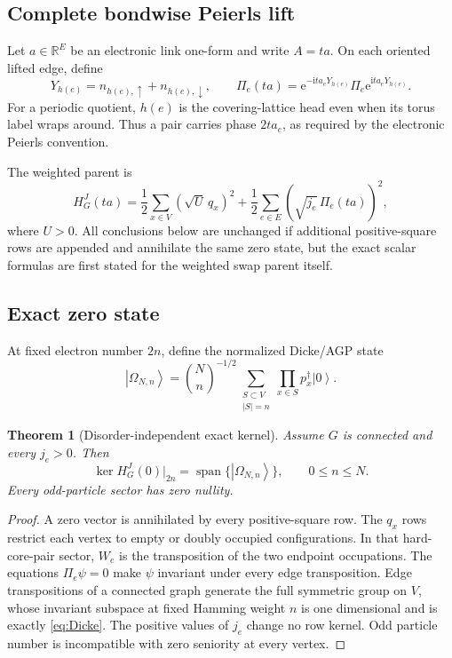 \documentclass[11pt]{article}
\newtheorem{theorem}{Theorem}[section]
\theoremstyle{definition}
\theoremstyle{remark}
\newcommand{\ket}[1]{\left|#1\right\rangle}
\newcommand{\I}{\mathrm i}
\newcommand{\e}{\mathrm e}
\newcommand{\R}{\mathbb R}
\newcommand{\Span}{\operatorname{span}}
\newcommand{\abs}[1]{\left\lvert #1\right\rvert}
\begin{document}
\subsection{Complete bondwise Peierls lift}

Let $a\in\R^E$ be an electronic link one-form and write $A=ta$.  On each oriented lifted edge, define
\begin{equation}
 Y_{h(e)}=n_{h(e),\uparrow}+n_{h(e),\downarrow},
 \qquad
 \Pi_e(ta)=\e^{-\I t a_eY_{h(e)}}\Pi_e\e^{\I t a_eY_{h(e)}}.
 \label{eq:Peierls-row}
\end{equation}
For a periodic quotient, $h(e)$ is the covering-lattice head even when its torus label wraps around.  Thus a pair carries phase $2ta_e$, as required by the electronic Peierls convention.

The weighted parent is
\begin{equation}
 \boxed{
 H_G^J(ta)=
 \frac12\sum_{x\in V}(\sqrt U\,q_x)^2
 +\frac12\sum_{e\in E}(\sqrt{j_e}\,\Pi_e(ta))^2,}
 \label{eq:weighted-parent}
\end{equation}
where $U>0$.  All conclusions below are unchanged if additional positive-square rows are appended and annihilate the same zero state, but the exact scalar formulas are first stated for the weighted swap parent itself.

\subsection{Exact zero state}

At fixed electron number $2n$, define the normalized Dicke/AGP state
\begin{equation}
 \ket{\Omega_{N,n}}
 =\binom Nn^{-1/2}
 \sum_{\substack{S\subset V\\\abs S=n}}
 \prod_{x\in S}p_x^\dagger\ket0.
 \label{eq:Dicke}
\end{equation}

\begin{theorem}[Disorder-independent exact kernel]
\label{thm:kernel}
Assume $G$ is connected and every $j_e>0$.  Then
\begin{equation}
 \ker H_G^J(0)\big|_{2n}
 =\Span\{\ket{\Omega_{N,n}}\},
 \qquad 0\le n\le N.
 \label{eq:kernel}
\end{equation}
Every odd-particle sector has zero nullity.
\end{theorem}

\begin{proof}
A zero vector is annihilated by every positive-square row.  The $q_x$ rows restrict each vertex to empty or doubly occupied configurations.  In that hard-core-pair sector, $W_e$ is the transposition of the two endpoint occupations.  The equations $\Pi_e\psi=0$ make $\psi$ invariant under every edge transposition.  Edge transpositions of a connected graph generate the full symmetric group on $V$, whose invariant subspace at fixed Hamming weight $n$ is one dimensional and is exactly \eqref{eq:Dicke}.  The positive values of $j_e$ change no row kernel.  Odd particle number is incompatible with zero seniority at every vertex.
\end{proof}
\end{document}
